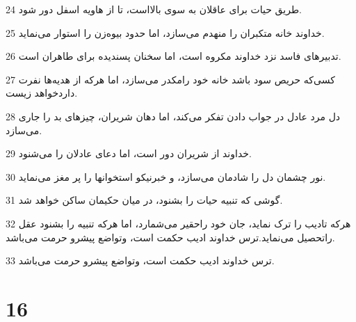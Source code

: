 \par 24 طریق حیات برای عاقلان به سوی بالااست، تا از هاویه اسفل دور شود.
\par 25 خداوند خانه متکبران را منهدم می‌سازد، اما حدود بیوه‌زن را استوار می‌نماید.
\par 26 تدبیرهای فاسد نزد خداوند مکروه است، اما سخنان پسندیده برای طاهران است.
\par 27 کسی‌که حریص سود باشد خانه خود رامکدر می‌سازد، اما هر‌که از هدیه‌ها نفرت داردخواهد زیست.
\par 28 دل مرد عادل در جواب دادن تفکر می‌کند، اما دهان شریران، چیزهای بد را جاری می‌سازد.
\par 29 خداوند از شریران دور است، اما دعای عادلان را می‌شنود.
\par 30 نور چشمان دل را شادمان می‌سازد، و خبرنیکو استخوانها را پر مغز می‌نماید.
\par 31 گوشی که تنبیه حیات را بشنود، در میان حکیمان ساکن خواهد شد.
\par 32 هر‌که تادیب را ترک نماید، جان خود راحقیر می‌شمارد، اما هر‌که تنبیه را بشنود عقل راتحصیل می‌نماید.ترس خداوند ادیب حکمت است، وتواضع پیشرو حرمت می‌باشد.
\par 33 ترس خداوند ادیب حکمت است، وتواضع پیشرو حرمت می‌باشد.
 
\chapter{16}

